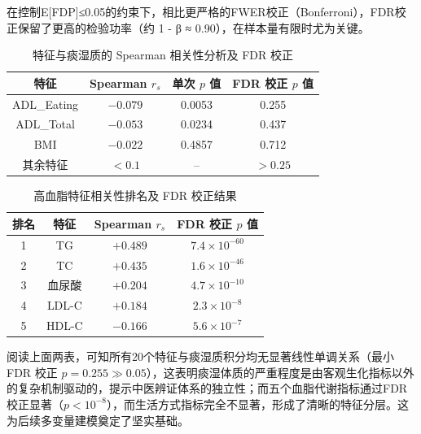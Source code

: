 \documentclass[12pt,a4paper]{ctexart}
\begin{document}
在控制E[FDP]≤0.05的约束下，相比更严格的FWER校正（Bonferroni），FDR校正保留了更高的检验功率（约 1 - β ≈ 0.90），在样本量有限时尤为关键。

\begin{table}[H]
\centering
\caption{特征与痰湿质的 Spearman 相关性分析及 FDR 校正}
\label{tab:spearman_results}
\begin{tabular}{cccc}
\toprule
特征 & Spearman $r_s$ & 单次 $p$ 值 & FDR 校正 $p$ 值 \\
\midrule
ADL\_Eating & $-0.079$ & 0.0053 & 0.255 \\
ADL\_Total  & $-0.053$ & 0.0234 & 0.437 \\
BMI         & $-0.022$ & 0.4857 & 0.712 \\
其余特征    & $<0.1$   & --     & $>0.25$ \\
\bottomrule
\end{tabular}
\end{table}
\begin{table}[H]
\centering
\caption{高血脂特征相关性排名及 FDR 校正结果}
\label{tab:rank_results}
\begin{tabular}{cccc}
\toprule
排名 & 特征 & Spearman $r_s$ & FDR 校正 $p$ 值 \\
\midrule
1 & TG     & $+0.489$ & $7.4 \times 10^{-60}$ \\
2 & TC     & $+0.435$ & $1.6 \times 10^{-46}$ \\
3 & 血尿酸 & $+0.204$ & $4.7 \times 10^{-10}$ \\
4 & LDL-C  & $+0.184$ & $2.3 \times 10^{-8}$  \\
5 & HDL-C  & $-0.166$ & $5.6 \times 10^{-7}$  \\
\bottomrule
\end{tabular}
\end{table}

阅读上面两表，可知所有20个特征与痰湿质积分均无显著线性单调关系（最小 FDR 校正 $p = 0.255 \gg 0.05$），这表明痰湿体质的严重程度是由客观生化指标以外的复杂机制驱动的，提示中医辨证体系的独立性；而五个血脂代谢指标通过FDR校正显著（$p < 10^{-8}$），而生活方式指标完全不显著，形成了清晰的特征分层。这为后续多变量建模奠定了坚实基础。
\end{document}
